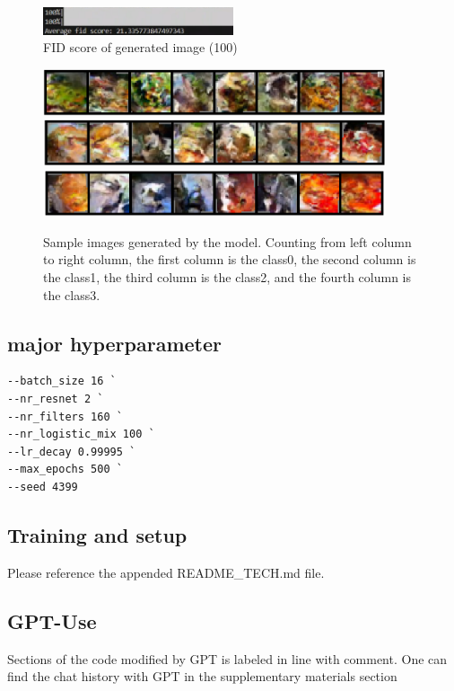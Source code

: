 \documentclass{article}
\begin{document}
  \begin{figure}
    \centering
    \includegraphics[width=0.5\textwidth]{report_data/o-fid-img.png}
    \caption{ FID score of generated image (100) }
    \label{fig:o-fid-fin}
  \end{figure}

  \begin{figure}
    \centering
    \includegraphics[width=0.9\textwidth]{report_data/o-1.png}
    \includegraphics[width=0.9\textwidth]{report_data/o-2.png}
    \includegraphics[width=0.9\textwidth]{report_data/o-3.png}
    \caption{ Sample images generated by the model. Counting from left column to right column, the first column is the class0, the second column is the class1, the third column is the class2, and the fourth column is the class3.}
    \label{fig:sample}
  \end{figure}

\subsection{major hyperparameter}
\begin{verbatim}
--batch_size 16 `
--nr_resnet 2 `
--nr_filters 160 `
--nr_logistic_mix 100 `
--lr_decay 0.99995 `
--max_epochs 500 `
--seed 4399
\end{verbatim}

\subsection{Training and setup}
Please reference the appended README\_TECH.md file.

\subsection{GPT-Use}
Sections of the code modified by GPT is labeled in line with comment. One can find the chat history with GPT in the supplementary materials section
\end{document}
